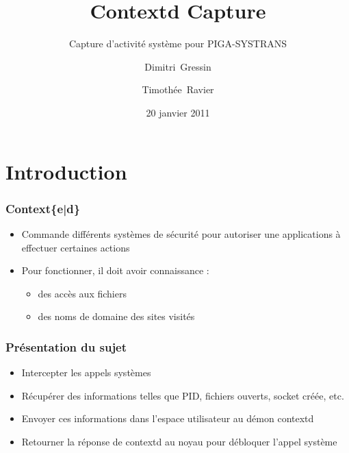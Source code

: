 \documentclass{beamer}
\title{Contextd Capture}
\subtitle{Capture d'activité système pour PIGA-SYSTRANS}
\author{Dimitri~Gressin \and Timothée~Ravier}
\institute{ENSI de Bourges}
\date{20 janvier 2011}
\begin{document}
{
	\framenumberoff
	\watermarkoff
	\begin{frame}
	\titlepage
	\end{frame}
}

\section{Introduction}
\begin{frame}
\frametitle{Context\{e|d\}}
\begin{itemize}
	\item Commande différents systèmes de sécurité pour autoriser une applications à effectuer certaines actions
	\item Pour fonctionner, il doit avoir connaissance :
		\begin{itemize}
			\item des accès aux fichiers
			\item des noms de domaine des sites visités
		\end{itemize}
\end{itemize}
\end{frame}

\begin{frame}
\frametitle{Présentation du sujet}
\begin{itemize}
	\item Intercepter les appels systèmes
	\item Récupérer des informations telles que PID, fichiers ouverts, socket créée, etc.
	\item Envoyer ces informations dans l'espace utilisateur au démon contextd
	\item Retourner la réponse de contextd au noyau pour débloquer l'appel système
\end{itemize}
\end{frame}
\end{document}
